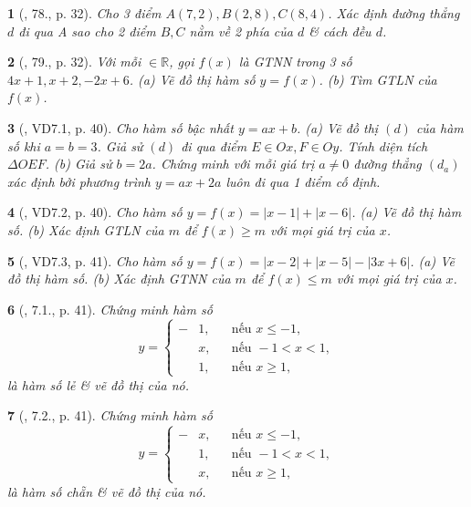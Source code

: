 \documentclass{article}
\newtheorem{baitoan}{}
\begin{document}
\begin{baitoan}[\cite{Binh_Toan_9_tap_1}, 78., p. 32]
	Cho 3 điểm $A(7,2),B(2,8),C(8,4)$. Xác định đường thẳng $d$ đi qua A sao cho 2 điểm $B,C$ nằm về 2 phía của $d$ \& cách đều $d$.
\end{baitoan}

\begin{baitoan}[\cite{Binh_Toan_9_tap_1}, 79., p. 32]
	Với mỗi $\in\mathbb{R}$, gọi $f(x)$ là {\rm GTNN} trong 3 số $4x + 1,x + 2,-2x + 6$. (a) Vẽ đồ thị hàm số $y = f(x)$. (b) Tìm {\rm GTLN} của $f(x)$.
\end{baitoan}

\begin{baitoan}[\cite{TLCT_THCS_Toan_9_dai_so}, VD7.1, p. 40]
	Cho hàm số bậc nhất $y = ax + b$. (a) Vẽ đồ thị $(d)$ của hàm số khi $a = b = 3$. Giả sử $(d)$ đi qua điểm $E\in Ox,F\in Oy$. Tính diện tích $\Delta OEF$. (b) Giả sử $b = 2a$. Chứng minh với mỗi giá trị $a\ne0$ đường thẳng $(d_a)$ xác định bởi phương trình $y = ax + 2a$ luôn đi qua 1 điểm cố định.
\end{baitoan}

\begin{baitoan}[\cite{TLCT_THCS_Toan_9_dai_so}, VD7.2, p. 40]
	Cho hàm số $y = f(x) = |x - 1| + |x - 6|$. (a) Vẽ đồ thị hàm số. (b) Xác định {\rm GTLN} của $m$ để $f(x)\ge m$ với mọi giá trị của $x$.
\end{baitoan}

\begin{baitoan}[\cite{TLCT_THCS_Toan_9_dai_so}, VD7.3, p. 41]
	Cho hàm số $y = f(x) = |x - 2| + |x - 5| - |3x + 6|$. (a) Vẽ đồ thị hàm số. (b) Xác định {\rm GTNN} của $m$ để $f(x)\le m$ với mọi giá trị của $x$.
\end{baitoan}

\begin{baitoan}[\cite{TLCT_THCS_Toan_9_dai_so}, 7.1., p. 41]
	Chứng minh hàm số
	\begin{equation*}
		y = \left\{\begin{split}
			-&1,&&\mbox{nếu } x\le-1,\\
			&x,&&\mbox{nếu } -1 < x < 1,\\
			&1,&&\mbox{nếu } x\ge 1,
		\end{split}\right.
	\end{equation*}
	là hàm số lẻ \& vẽ đồ thị của nó.
\end{baitoan}

\begin{baitoan}[\cite{TLCT_THCS_Toan_9_dai_so}, 7.2., p. 41]
	Chứng minh hàm số
	\begin{equation*}
		y = \left\{\begin{split}
			-&x,&&\mbox{nếu } x\le-1,\\
			&1,&&\mbox{nếu } -1 < x < 1,\\
			&x,&&\mbox{nếu } x\ge 1,
		\end{split}\right.
	\end{equation*}
	là hàm số chẵn \& vẽ đồ thị của nó.
\end{baitoan}
\end{document}

